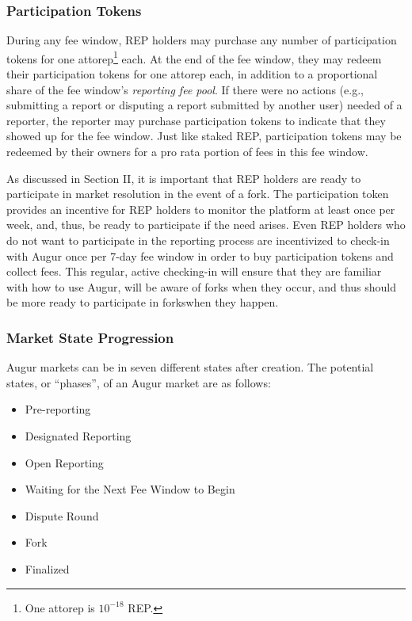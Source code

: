 \documentclass[12pt,floatfix,reprint,nofootinbib,amsmath,amssymb,epsfig,pre,floats,letterpaper,groupedaffiliation]{revtex4-1}
\theoremstyle{definition}
\theoremstyle{definition}
\begin{document}
\subsubsection{Participation Tokens}

During any fee window, REP holders may purchase any number of participation tokens for one attorep\footnote{One attorep is $10^{-18}$ REP.} each. At the end of the fee window, they may redeem their\linebreak \vspace{\baselineskip} participation tokens for one attorep each, in addition to a proportional share of the fee window's \textit{reporting fee pool}. If there were no actions (e.g., submitting a report or disputing a report submitted by another user) needed of a reporter, the reporter may purchase participation tokens to indicate that they showed up for the fee window. Just like staked REP, participation tokens may be redeemed by their owners for a pro rata portion of fees in this fee window.

As discussed in Section II, it is important that REP holders are ready to participate in market resolution in the event of a fork. The participation token provides an incentive for REP holders to monitor the platform at least once per week, and, thus, be ready to participate if the need arises. Even REP holders who do not want to participate in the reporting process are incentivized to check-in with Augur once per 7-day fee window in order to buy participation tokens and collect fees. This regular, active checking-in will ensure that they are familiar with how to use Augur, will be aware of forks when they occur, and thus should be more ready to participate in forks\linebreak when they happen.

\subsubsection{Market State Progression}

Augur markets can be in seven different states after creation. The potential states, or ``phases'', of an Augur market are as follows:

\begin{itemize}
\item Pre-reporting
\item Designated Reporting
\item Open Reporting
\item Waiting for the Next Fee Window to Begin
\item Dispute Round
\item Fork
\item Finalized
\end{itemize}
\end{document}
